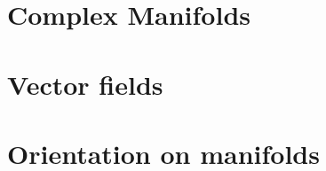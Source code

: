 \section{Complex Manifolds}









\section{Vector fields}








\section{Orientation on manifolds}










% 


